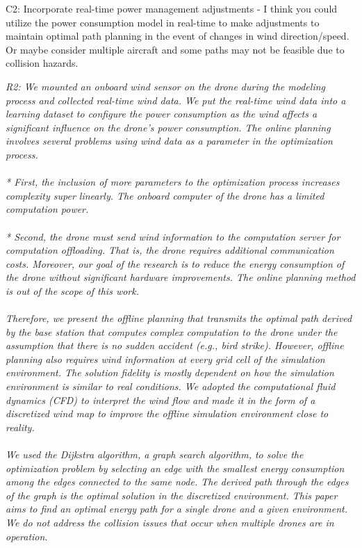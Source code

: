 \documentclass[onecolumn]{IEEEconf}
\begin{document}
\begin{description}
    {
	C2: Incorporate real-time power management adjustments - I think you could utilize the power consumption model in real-time to make adjustments to maintain optimal path planning in the event of changes in wind direction/speed. Or maybe consider multiple aircraft and some paths may not be feasible due to collision hazards.
	}
	\item \textit
	{
	R2: We mounted an onboard wind sensor on the drone during the modeling process and collected real-time wind data. We put the real-time wind data into a learning dataset to configure the power consumption as the wind affects a significant influence on the drone's power consumption. The online planning involves several problems using wind data as a parameter in the optimization process. ~\\~\\
    * First, the inclusion of more parameters to the optimization process increases complexity super linearly. The onboard computer of the drone has a limited computation power.~\\~\\
    * Second, the drone must send wind information to the computation server for computation offloading. That is, the drone requires additional communication costs. Moreover, our goal of the research is to reduce the energy consumption of the drone without significant hardware improvements. The online planning method is out of the scope of this work.~\\~\\
    Therefore, we present the offline planning that transmits the optimal path derived by the base station that computes complex computation to the drone under the assumption that there is no sudden accident (e.g., bird strike). However, offline planning also requires wind information at every grid cell of the simulation environment. The solution fidelity is mostly dependent on how the simulation environment is similar to real conditions. 
    We adopted the computational fluid dynamics (CFD) to interpret the wind flow and made it in the form of a discretized wind map to improve the offline simulation environment close to reality. ~\\~\\
    We used the Dijkstra algorithm, a graph search algorithm, to solve the optimization problem by selecting an edge with the smallest energy consumption among the edges connected to the same node. The derived path through the edges of the graph is the optimal solution in the discretized environment. This paper aims to find an optimal energy path for a single drone and a given environment. We do not address the collision issues that occur when multiple drones are in operation.
}
\end{description}
\end{document}
